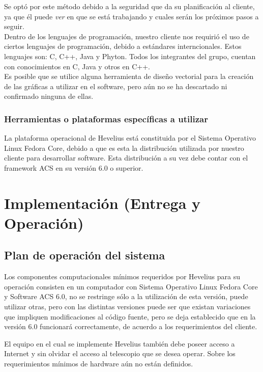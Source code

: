 \documentclass[letterpaper,titlepage,spanish,10pt]{article}
\begin{document}
Se opt\'o por este m\'etodo debido a la seguridad que da su planificaci\'on al cliente, ya que \'el 
puede \textit{ver} en que se est\'a trabajando y cuales ser\'an los pr\'oximos pasos a seguir.\\

Dentro de los lenguajes de programaci\'on, nuestro cliente nos requiri\'o el uso de ciertos lenguajes 
de programaci\'on, debido a est\'andares interncionales. Estos lenguajes son: C, C++, Java y Phyton. 
Todos los integrantes del grupo, cuentan con conocimientos en C, Java y otros en C++.\\

Es posible que se utilice alguna herramienta de dise\~no vectorial para la creaci\'on de las gr\'aficas 
a utilizar en el software, pero a\'un no se ha descartado ni confirmado ninguna de ellas.\\


\subsubsection{Herramientas o plataformas espec\'ificas a utilizar}

La plataforma operacional de Hevelius est\'a constituida por el Sistema Operativo Linux Fedora Core, 
debido a que es esta la distribuci\'on utilizada por nuestro cliente para desarrollar software. Esta 
distribuci\'on a su vez debe contar con el framework ACS en su versi\'on 6.0 o superior.\\



\newpage
\section{Implementaci\'on (Entrega y Operaci\'on)} %
\subsection{Plan de operaci\'on del sistema}
Los componentes computacionales m\'inimos requeridos por Hevelius para su 
operaci\'on consisten en un computador con Sistema Operativo Linux Fedora Core 
y Software ACS 6.0, no se restringe s\'olo a la utilizaci\'on de esta versi\'on, puede 
utilizar otras, pero con las distintas versiones puede ser que existan variaciones 
que impliquen modificaciones al c\'odigo fuente, pero se deja 
establecido que en la versi\'on 6.0 funcionar\'a correctamente, de acuerdo 
a los requerimientos del cliente.

El equipo en el cual se implemente Hevelius tambi\'en debe poseer acceso 
a Internet y sin olvidar el acceso al telescopio que se desea operar. Sobre 
los requerimientos m\'inimos de hardware a\'un no est\'an definidos.
\end{document}
